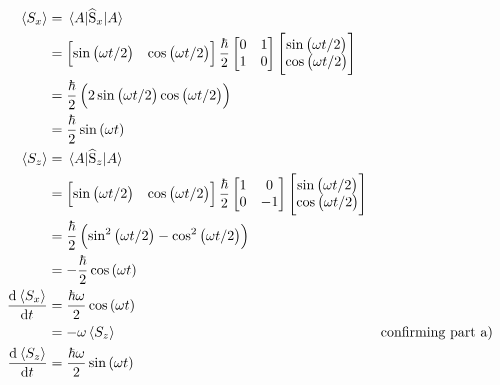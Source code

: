 \subsection{}
\begin{align*}
    \expectationvalue{S_x} & = \expectationvalue{\widehat{\operatorname{S}}_x}{A}\\
    & =
    \begin{bmatrix}
        \sin{\del{\omega t / 2}} & \cos{\del{\omega t / 2}}
    \end{bmatrix}
    \frac{\hbar}{2}
    \begin{bmatrix}
        0 & 1\\
        1 & 0
    \end{bmatrix}
    \begin{bmatrix}
        \sin{\del{\omega t / 2}}\\
        \cos{\del{\omega t / 2}}
    \end{bmatrix}
    \\
    & = \frac{\hbar}{2} \del{2 \sin{\del{\omega t / 2}} \cos{\del{\omega t / 2}}}\\
    & = \frac{\hbar}{2} \sin{\del{\omega t}}\\
    \expectationvalue{S_z} & = \expectationvalue{\widehat{\operatorname{S}}_z}{A}\\
    & = 
    \begin{bmatrix}
        \sin{\del{\omega t / 2}} & \cos{\del{\omega t / 2}}
    \end{bmatrix}
    \frac{\hbar}{2}
    \begin{bmatrix}
        1 & 0\\
        0 & -1
    \end{bmatrix}
    \begin{bmatrix}
        \sin{\del{\omega t / 2}}\\
        \cos{\del{\omega t / 2}}
    \end{bmatrix}
    \\
    & = \frac{\hbar}{2} \del{\sin^2{\del{\omega t / 2}} - \cos^2{\del{\omega t / 2}}}\\
    & = - \frac{\hbar}{2} \cos{\del{\omega t}}\\
    \dod{\expectationvalue{S_x}}{t} & = \frac{\hbar \omega}{2} \cos{\del{\omega t}}\\
    & = - \omega \expectationvalue{S_z} & \textrm{confirming part a)}\\
    \dod{\expectationvalue{S_z}}{t} & = \frac{\hbar \omega}{2} \sin{\del{\omega t}}
\end{align*}
